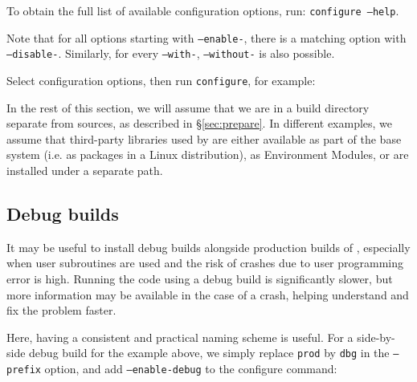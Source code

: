 \documentclass[a4paper,10pt,twoside]{csshortdoc}
\begin{document}
To obtain the full list of available configuration options,
run: {\tt configure~--help}.

Note that for all options starting with {\tt --enable-},
there is a matching option with {\tt --disable-}. Similarly,
for every {\tt --with-}, {\tt --without-} is also possible.

Select configuration options, then run {\tt configure}, for example:


In the rest of this section, we will assume that we are in
a build directory separate from sources, as described in
\S\ref{sec:prepare}. In different examples, we assume
that third-party libraries used by \CS are either available
as part of the base system (i.e. as packages in a Linux distribution),
as Environment Modules, or are installed under a separate path.

\subsection{Debug builds\label{sec:config:shared}}

It may be useful to install debug builds alongside production
builds of \CS, especially when user subroutines are used
and the risk of crashes due to user programming error is high.
Running the code using a debug build is significantly
slower, but more information may be available in the case
of a crash, helping understand and fix the problem faster.

Here, having a consistent and practical naming scheme is useful.
For a side-by-side debug build for the example above, we simply replace \texttt{prod} by
\texttt{dbg} in the \texttt{--prefix} option, and add
\texttt{--enable-debug} to the configure command:
\end{document}

